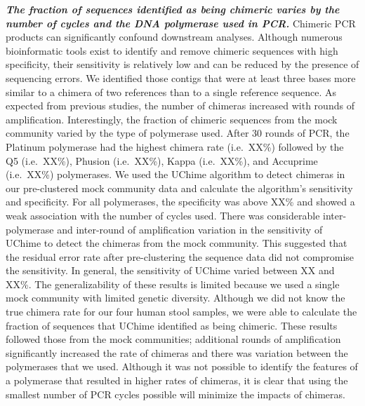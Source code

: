 \documentclass[11,]{article}
\begin{document}
\textbf{\emph{The fraction of sequences identified as being chimeric
varies by the number of cycles and the DNA polymerase used in PCR.}}
Chimeric PCR products can significantly confound downstream analyses.
Although numerous bioinformatic tools exist to identify and remove
chimeric sequences with high specificity, their sensitivity is
relatively low and can be reduced by the presence of sequencing errors.
We identified those contigs that were at least three bases more similar
to a chimera of two references than to a single reference sequence. As
expected from previous studies, the number of chimeras increased with
rounds of amplification. Interestingly, the fraction of chimeric
sequences from the mock community varied by the type of polymerase used.
After 30 rounds of PCR, the Platinum polymerase had the highest chimera
rate (i.e.~XX\%) followed by the Q5 (i.e.~XX\%), Phusion (i.e.~XX\%),
Kappa (i.e.~XX\%), and Accuprime (i.e.~XX\%) polymerases. We used the
UChime algorithm to detect chimeras in our pre-clustered mock community
data and calculate the algorithm's sensitivity and specificity. For all
polymerases, the specificity was above XX\% and showed a weak
association with the number of cycles used. There was considerable
inter-polymerase and inter-round of amplification variation in the
sensitivity of UChime to detect the chimeras from the mock community.
This suggested that the residual error rate after pre-clustering the
sequence data did not compromise the sensitivity. In general, the
sensitivity of UChime varied between XX and XX\%. The generalizability
of these results is limited because we used a single mock community with
limited genetic diversity. Although we did not know the true chimera
rate for our four human stool samples, we were able to calculate the
fraction of sequences that UChime identified as being chimeric. These
results followed those from the mock communities; additional rounds of
amplification significantly increased the rate of chimeras and there was
variation between the polymerases that we used. Although it was not
possible to identify the features of a polymerase that resulted in
higher rates of chimeras, it is clear that using the smallest number of
PCR cycles possible will minimize the impacts of chimeras.
\end{document}
